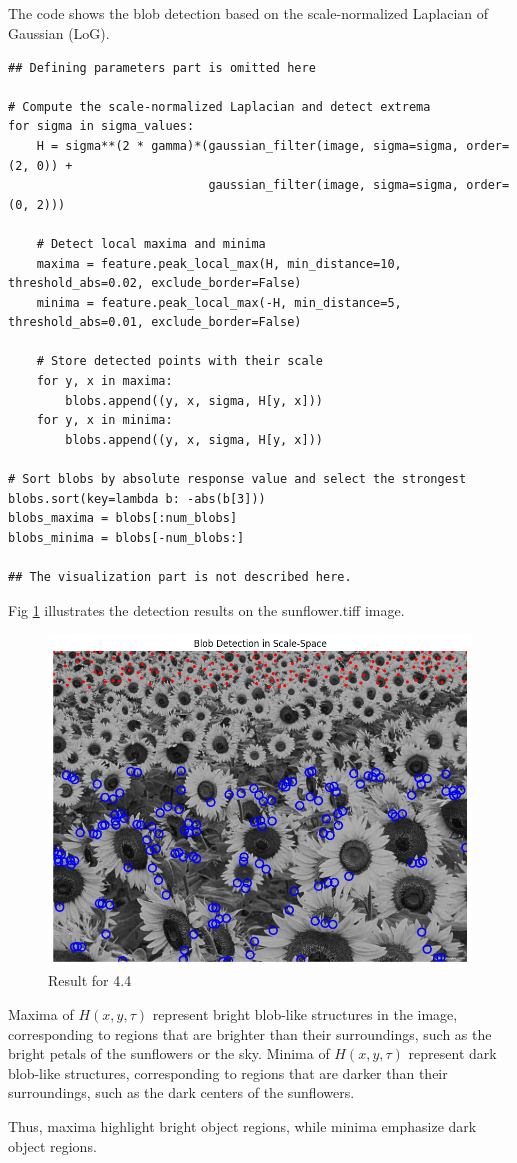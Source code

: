 \documentclass[12pt]{article}
\begin{document}
\subsection{}
The code shows the blob detection based on the scale-normalized Laplacian of Gaussian (LoG).
\begin{lstlisting}[caption={Code for 4.4},captionpos=b]
## Defining parameters part is omitted here

# Compute the scale-normalized Laplacian and detect extrema
for sigma in sigma_values:
    H = sigma**(2 * gamma)*(gaussian_filter(image, sigma=sigma, order=(2, 0)) +
                            gaussian_filter(image, sigma=sigma, order=(0, 2)))

    # Detect local maxima and minima
    maxima = feature.peak_local_max(H, min_distance=10, threshold_abs=0.02, exclude_border=False)
    minima = feature.peak_local_max(-H, min_distance=5, threshold_abs=0.01, exclude_border=False)

    # Store detected points with their scale
    for y, x in maxima:
        blobs.append((y, x, sigma, H[y, x]))
    for y, x in minima:
        blobs.append((y, x, sigma, H[y, x]))

# Sort blobs by absolute response value and select the strongest
blobs.sort(key=lambda b: -abs(b[3]))
blobs_maxima = blobs[:num_blobs]
blobs_minima = blobs[-num_blobs:]

## The visualization part is not described here.

\end{lstlisting}

Fig \ref{fig:4.4} illustrates the detection results on the sunflower.tiff image.


\FloatBarrier

\begin{figure}[ht]
    \centering
    \includegraphics[width=0.7\columnwidth, keepaspectratio]{pics/a5-4.4.png}
    \caption[]{Result for 4.4}
    \label{fig:4.4}
\end{figure}

\FloatBarrier

Maxima of \( H(x,y,\tau) \) represent bright blob-like structures in the image, corresponding to regions that are brighter than their surroundings, such as the bright petals of the sunflowers or the sky. Minima of \( H(x,y,\tau) \) represent dark blob-like structures, corresponding to regions that are darker than their surroundings, such as the dark centers of the sunflowers.

Thus, maxima highlight bright object regions, while minima emphasize dark object regions.
\end{document}
